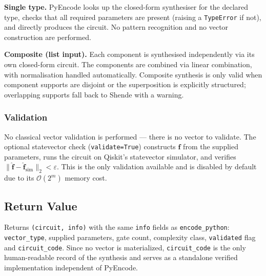 \documentclass[10pt,twocolumn]{article}
\newcommand{\bigO}[1]{\mathcal{O}(#1)}
\begin{document}
\textbf{Single type.}
PyEncode looks up the closed-form synthesiser for the
declared type, checks that all required parameters are
present (raising a \texttt{TypeError} if not), and
directly produces the circuit. No pattern recognition
and no vector construction are performed.

\textbf{Composite (list input).}
Each component is synthesised independently via its
own closed-form circuit. The components are combined
via linear combination, with normalisation handled
automatically. Composite synthesis is only valid when
component supports are disjoint or the superposition
is explicitly structured; overlapping supports fall
back to Shende with a warning.

\subsubsection*{Validation}

No classical vector validation is performed --- there
is no vector to validate. The optional statevector
check (\texttt{validate=True}) constructs
$\mathbf{f}$ from the supplied parameters, runs the
circuit on Qiskit's statevector simulator, and verifies
$\|\hat{\mathbf{f}}-\hat{\mathbf{f}}_\mathrm{sim}\|_2
< \varepsilon$. This is the only validation available
and is disabled by default due to its $\bigO{2^m}$
memory cost.

\subsection*{Return Value}

Returns \texttt{(circuit, info)} with the same
\texttt{info} fields as \texttt{encode\_python}:
\texttt{vector\_type}, supplied parameters, gate count,
complexity class, \texttt{validated} flag and
\texttt{circuit\_code}. Since no vector is materialized,
\texttt{circuit\_code} is the only human-readable record
of the synthesis and serves as a standalone verified
implementation independent of PyEncode.
\end{document}

